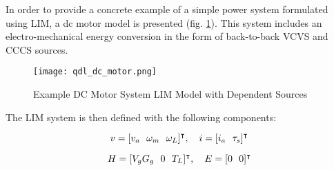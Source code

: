 In order to provide a concrete example of a simple power system formulated using LIM, a dc motor model is presented (fig. \ref{fig:qdl_dc_motor}). This system includes an electro-mechanical energy conversion in the form of back-to-back VCVS and CCCS sources. 

\begin{figure}[ht]
    \label{fig:qdl_dc_motor}
    \centering
    \texttt{[image: qdl\_dc\_motor.png]}
    \caption{Example DC Motor System LIM Model with Dependent Sources}
\end{figure}

\bigskip
The LIM system is then defined with the following components:
\bigskip

\begin{equation} \label{eq:lim_sys_1}
v = [v_a \ \ \omega_m \ \ \omega_L]^\intercal,  \ \ \ 
i = [i_a \ \ \tau_s]^\intercal    \\
\end{equation}

\begin{equation} \label{eq:lim_sys_2}
H = [V_g G_g \ \ 0 \ \ T_L]^\intercal,  \ \ \ 
E = [0 \ \ 0]^\intercal    \\
\end{equation}

